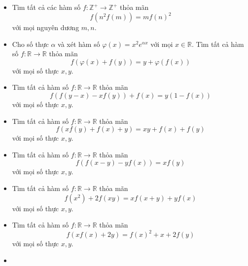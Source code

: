 \documentclass[11pt]{scrartcl}
\begin{document}
\begin{itemize}[label=, leftmargin=0em, itemsep=-0em]
    \item \begin{btvn}
        Tìm tất cả các hàm số $f: \mathbb{Z}^+ \to \mathbb{Z}^+$ thỏa mãn
        \[
           f(n^2f(m)) = mf(n)^2
        \]
        với mọi nguyên dương $m,n$.
    \end{btvn}
    \item \begin{btvn}
         Cho số thực $\alpha$ và xét hàm số $\varphi(x)=x^2 e^{\alpha x}$ với mọi $x \in \mathbb{R}$. Tìm tất cả hàm số $f: \mathbb{R} \rightarrow \mathbb{R}$ thỏa mãn
            $$
            f(\varphi(x)+f(y))=y+\varphi(f(x))
            $$
            với mọi số thực $x, y$.
    \end{btvn}
    \item \begin{btvn}
        Tìm tất cả hàm số $f: \mathbb{R} \rightarrow \mathbb{R}$ thỏa mãn
        $$
        f(f(y-x)-x f(y))+f(x)=y(1-f(x))
        $$
        với mọi số thực $x, y$.
    \end{btvn}
    \item \begin{btvn}
        Tìm tất cả hàm số $f: \mathbb{R} \rightarrow \mathbb{R}$ thỏa mãn
        $$
        f(x f(y)+f(x)+y)=x y+f(x)+f(y)
        $$
        với mọi số thực $x, y$.
    \end{btvn}
    \item \begin{btvn}
        Tìm tất cả hàm số $f: \mathbb{R} \rightarrow \mathbb{R}$ thỏa mãn
        $$
        f(f(x-y)-y f(x))=x f(y)
        $$
        với mọi số thực $x, y$.
    \end{btvn}
    \item \begin{btvn}
        Tìm tất cả hàm số $f: \mathbb{R} \rightarrow \mathbb{R}$ thỏa mãn
        $$
        f\left(x^2\right)+2 f(x y)=x f(x+y)+y f(x)
        $$
        với mọi số thực $x, y$.
    \end{btvn}
    \item \begin{btvn}
        Tìm tất cả hàm số $f: \mathbb{R} \rightarrow \mathbb{R}$ thỏa mãn
        $$
        f(x f(x)+2 y)=f(x)^2+x+2 f(y)
        $$
        với mọi số thực $x, y$.
    \end{btvn}
    \item \begin{btvn}

\end{btvn}
\end{itemize}
\end{document}
